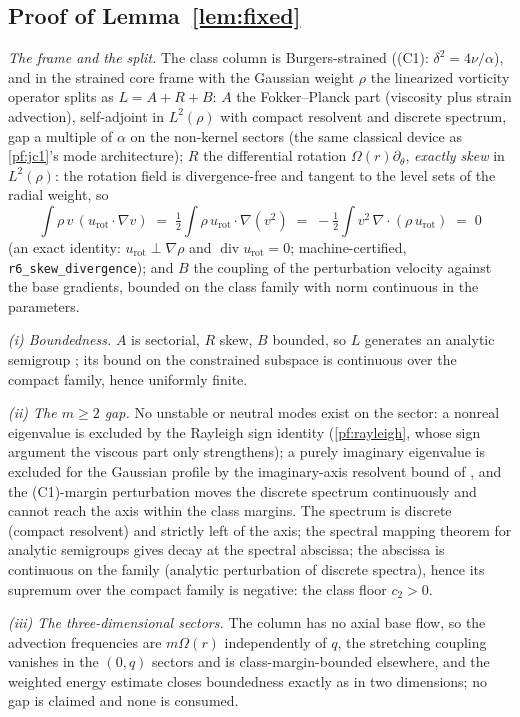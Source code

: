 \documentclass[11pt,letterpaper]{amsart}
\theoremstyle{definition}
\theoremstyle{remark}
\begin{document}
\subsection{Proof of Lemma~\ref{lem:fixed}}\label{pf:fixed}
\emph{The frame and the split.} The class column is Burgers-strained
(\textup{(C1)}: $\delta^2=4\nu/\alpha$), and in the strained core frame with the
Gaussian weight $\rho$ the linearized vorticity operator splits as $L=A+R+B$:
$A$ the Fokker--Planck part (viscosity plus strain advection), self-adjoint in
$L^2(\rho)$ with compact resolvent and discrete spectrum, gap a multiple of
$\alpha$ on the non-kernel sectors (the same classical device as
\cref{pf:jc1}'s mode architecture); $R$ the differential rotation
$\Omega(r)\partial_\theta$, \emph{exactly skew} in $L^2(\rho)$: the rotation
field is divergence-free and tangent to the level sets of the radial weight, so
\[
\int \rho\, v\,(u_{\mathrm{rot}}\!\cdot\!\nabla v)
\;=\;\tfrac12\int \rho\, u_{\mathrm{rot}}\!\cdot\!\nabla(v^2)
\;=\;-\tfrac12\int v^2\,\nabla\!\cdot\!(\rho\,u_{\mathrm{rot}})\;=\;0
\]
(an exact identity: $u_{\mathrm{rot}}\perp\nabla\rho$ and
$\operatorname{div}u_{\mathrm{rot}}=0$; machine-certified,
\texttt{r6\_skew\_divergence}); and $B$ the coupling of the perturbation
velocity against the base gradients, bounded on the class family with norm
continuous in the parameters.

\emph{(i) Boundedness.} $A$ is sectorial, $R$ skew, $B$ bounded, so $L$
generates an analytic semigroup \cite{EngelNagel2000}; its bound on the
constrained subspace is continuous over the compact family, hence uniformly
finite.

\emph{(ii) The $m\ge2$ gap.} No unstable or neutral modes exist on the sector:
a nonreal eigenvalue is excluded by the Rayleigh sign identity
(\cref{pf:rayleigh}, whose sign argument the viscous part only strengthens); a
purely imaginary eigenvalue is excluded for the Gaussian profile by the
imaginary-axis resolvent bound of \cite{LiWeiZhang2020}, and the
\textup{(C1)}-margin perturbation moves the discrete spectrum continuously and
cannot reach the axis within the class margins. The spectrum is discrete
(compact resolvent) and strictly left of the axis; the spectral mapping theorem
for analytic semigroups \cite{EngelNagel2000} gives decay at the spectral
abscissa; the abscissa is continuous on the family (analytic perturbation of
discrete spectra), hence its supremum over the compact family is negative: the
class floor $c_2>0$.

\emph{(iii) The three-dimensional sectors.} The column has no axial base flow,
so the advection frequencies are $m\Omega(r)$ independently of $q$, the
stretching coupling vanishes in the $(0,q)$ sectors and is class-margin-bounded
elsewhere, and the weighted energy estimate closes boundedness exactly as in
two dimensions; no gap is claimed and none is consumed.
\end{document}
